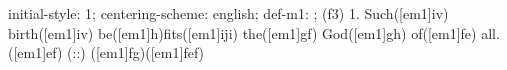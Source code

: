 initial-style: 1;
centering-scheme: english;
def-m1: \grealign;
(f3) 1. Such([em1]iv) birth([em1]iv) be([em1]h)fits([em1]iji) the([em1]gf) God([em1]gh) of([em1]fe) all.([em1]ef) (::) ([em1]fg)([em1]fef)